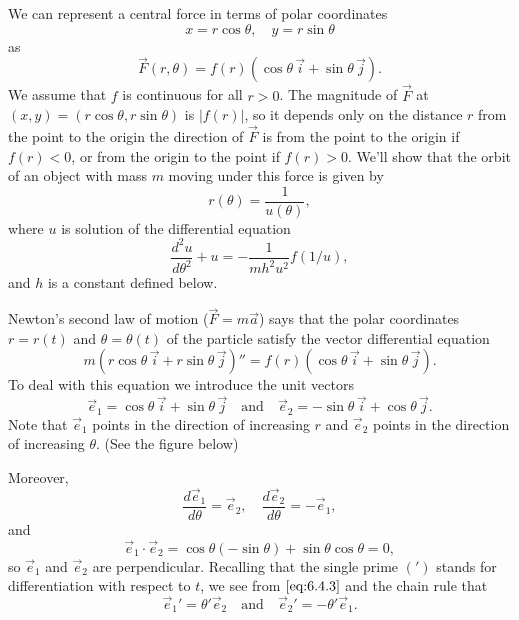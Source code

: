 \documentclass{ximera}
\begin{document}
We can represent a central force in terms of polar coordinates
$$
x=r\cos\theta,\quad y=r\sin\theta
$$
 as
$$
\vec{F}(r,\theta)=f(r)(\cos\theta\,\vec{i}+\sin\theta\,\vec{j}).
$$
We assume that $f$ is continuous for all $r>0$. The magnitude of $\vec{F}$ at $(x,y)=(r\cos\theta,r\sin\theta)$ is $|f(r)|$, so it depends
only on the distance $r$ from the point to the origin   the direction
of $\vec{F}$ is from the point to the origin if $f(r)<0$, or from the
origin to the point if $f(r)>0$. We'll show that the orbit of an
object with mass $m$ moving under this force is given by
$$
r(\theta)=\frac{1}{u(\theta)},
$$
where $u$  is solution of the differential equation
\begin{equation} \label{eq:6.4.1}
 \frac{d^2u}{d\theta^2}+u=-\frac{1}{mh^2u^2}f(1/u),
\end{equation}
and $h$ is a constant defined below.



Newton's second law of motion ($\vec{F}=m\vec{a}$) says that the polar
coordinates
$r=r(t)$ and $\theta=\theta(t)$ of
the particle  satisfy the vector differential equation
\begin{equation} \label{eq:6.4.2}
m(r\cos\theta\,\vec{i}+r\sin\theta\,\vec{j})''=
f(r)(\cos\theta\,\vec{i}+\sin\theta\,\vec{j}).
\end{equation}
To deal with this equation we introduce  the unit vectors
$$
\vec{e}_1=\cos\theta\,\vec{i}+\sin\theta\,\vec{j}
\quad\mbox{and}\quad
\vec{e}_2=-\sin\theta\,\vec{i}+\cos\theta\,\vec{j}.
$$
Note that   $\vec{e}_1$ points in the
direction of increasing $r$ and $\vec{e}_2$ points in the
direction of increasing $\theta$.  (See the figure below)

\begin{center}
\end{center}


Moreover,
\begin{equation} \label{eq:6.4.3}
\frac{d\vec{e}_1}{d\theta}=\vec{e}_2,\quad
\frac{d\vec{e}_2}{d\theta}=-\vec{e}_1,
\end{equation}
and
$$
\vec{e}_1\cdot\vec{e}_2=\cos\theta(-\sin\theta)+\sin\theta\cos\theta=0,
$$
so $\vec{e}_1$ and $\vec{e}_2$ are  perpendicular.
Recalling that the single prime $(')$ stands for differentiation with
respect to
$t$, we see from $\eqref{eq:6.4.3}$ and the chain rule that
\begin{equation} \label{eq:6.4.4}
\vec{e}_1'=\theta'\vec{e}_2\quad\mbox{and}\quad
\vec{e}_2'=-\theta'\vec{e}_1.
\end{equation}
\end{document}
